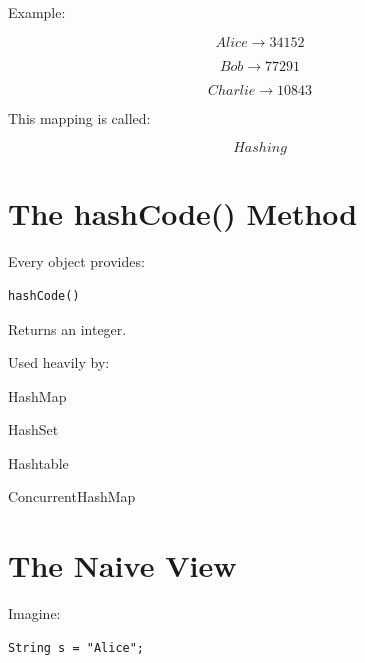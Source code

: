 \documentclass[11pt,a4paper]{book}
\begin{document}

Example:

\[
Alice
\rightarrow
34152
\]


\[
Bob
\rightarrow
77291
\]


\[
Charlie
\rightarrow
10843
\]


This mapping is called:

\[
Hashing
\]


\section{The hashCode() Method}

Every object provides:

\begin{verbatim} 
hashCode()
\end{verbatim}


Returns an integer.


Used heavily by:


HashMap

HashSet

Hashtable

ConcurrentHashMap


\section{The Naive View}

Imagine:

\begin{verbatim} 
String s = "Alice";
\end{verbatim}

\end{document}

